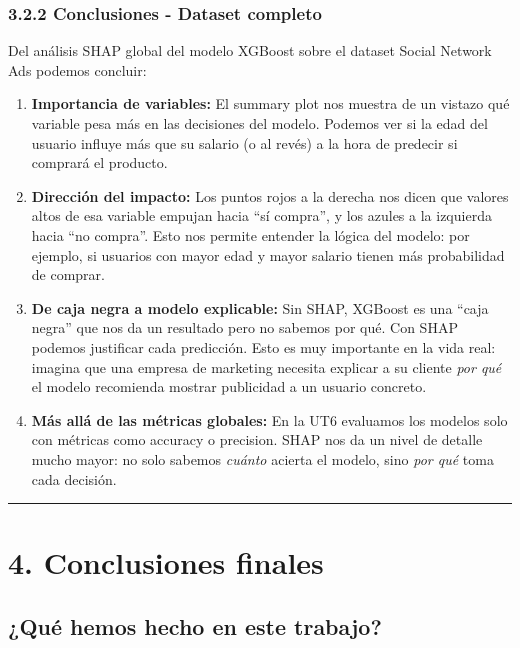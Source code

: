 \documentclass[11pt]{article}
\begin{document}
    \subsubsection{3.2.2 Conclusiones - Dataset
completo}\label{conclusiones---dataset-completo}

Del análisis SHAP global del modelo XGBoost sobre el dataset Social
Network Ads podemos concluir:

\begin{enumerate}
\def\labelenumi{\arabic{enumi}.}
\item
  \textbf{Importancia de variables:} El summary plot nos muestra de un
  vistazo qué variable pesa más en las decisiones del modelo. Podemos
  ver si la edad del usuario influye más que su salario (o al revés) a
  la hora de predecir si comprará el producto.
\item
  \textbf{Dirección del impacto:} Los puntos rojos a la derecha nos
  dicen que valores altos de esa variable empujan hacia ``sí compra'', y
  los azules a la izquierda hacia ``no compra''. Esto nos permite
  entender la lógica del modelo: por ejemplo, si usuarios con mayor edad
  y mayor salario tienen más probabilidad de comprar.
\item
  \textbf{De caja negra a modelo explicable:} Sin SHAP, XGBoost es una
  ``caja negra'' que nos da un resultado pero no sabemos por qué. Con
  SHAP podemos justificar cada predicción. Esto es muy importante en la
  vida real: imagina que una empresa de marketing necesita explicar a su
  cliente \emph{por qué} el modelo recomienda mostrar publicidad a un
  usuario concreto.
\item
  \textbf{Más allá de las métricas globales:} En la UT6 evaluamos los
  modelos solo con métricas como accuracy o precision. SHAP nos da un
  nivel de detalle mucho mayor: no solo sabemos \emph{cuánto} acierta el
  modelo, sino \emph{por qué} toma cada decisión.
\end{enumerate}

\begin{center}\rule{0.5\linewidth}{0.5pt}\end{center}

\section{4. Conclusiones finales}\label{conclusiones-finales}

\subsection{¿Qué hemos hecho en este
trabajo?}\label{quuxe9-hemos-hecho-en-este-trabajo}
\end{document}
